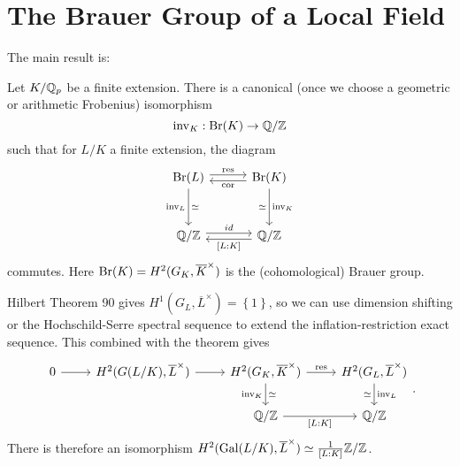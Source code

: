 \documentclass[class=article, crop=false]{standalone}
\begin{document}
\section{The Brauer Group of a Local Field}
The main result is:
\begin{theorem}
	Let $K/\mathbb{Q}_p$ be a finite extension. There is a canonical (once we choose a geometric or arithmetic Frobenius) isomorphism
	\[
		\operatorname{inv}_K:\operatorname{Br}(K)\to\mathbb{Q}/\mathbb{Z}
	\] 
	such that for $L/K$ a finite extension, the diagram
	\[
	\begin{tikzcd}[row sep=3em, column sep=3em]
		\Br(L)\ar[r,shift left,"\res"]\ar[d,swap,"\inv_L", "\simeq"'] & \Br(K)\ar[l,shift left,"\cor"]\ar[d,"\inv_K","\simeq"']\\
		\QQ/\ZZ\ar[r,shift left,"id"] & \QQ/\ZZ\ar[l,shift left,"{[L:K]}"]
	\end{tikzcd}
	\] 
	commutes. Here $\operatorname{Br}(K)=H^{2}(G_K,\overline{K}^{\times})$ is the (cohomological) Brauer group.
\end{theorem}
Hilbert Theorem 90 gives $H^{1}(G_L,\overline{L}^{\times})=\left\lbrace1\right\rbrace$, so we can use dimension shifting or the Hochschild-Serre spectral sequence to extend the inflation-restriction exact sequence. This combined with the theorem gives
\[
\begin{tikzcd}
	0\ar[r] & H^{2}(G(L/K),\overline{L}^{\times})\ar[r] & H^{2}(G_K,\overline{K}^{\times})\ar{r}{\res}\ar[d,"\inv_K"',"\simeq"] & H^{2}(G_L,\overline{L}^{\times})\ar[d,"\inv_L","\simeq"']\\
		& & \QQ/\ZZ\ar{r}[swap]{[L:K]} & \QQ/\ZZ
\end{tikzcd}
.\] 
There is therefore an isomorphism $H^{2}(\operatorname{Gal}(L/K),\overline{L}^{\times})\simeq\frac{1}{[L:K]}\mathbb{Z}/\mathbb{Z}$.\\
\end{document}
